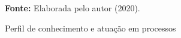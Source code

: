 \begin{figure}[ht!]
\centering

\caption{\textmd{Perfil de conhecimento e atuação em processos}}
\label{fig:grauconhecimento}

\par\medskip\textbf{Fonte:} Elaborada pelo autor (2020). \par\medskip

\end{figure}


